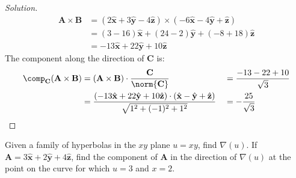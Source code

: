 \documentclass[crop=false,class=book,oneside]{standalone}
\begin{document}
\begin{proof}[Solution]
                \begin{align*}
                    \mathbf{A}\times\mathbf{B}
                    &=
                    (2\hat{\mathbf{x}}
                    +3\hat{\mathbf{y}}
                    -4\hat{\mathbf{z}})
                    \times
                    (-6\hat{\mathbf{x}}
                    -4\hat{\mathbf{y}}
                    +\hat{\mathbf{z}})\\
                    &=
                    (3-16)\hat{\mathbf{x}}
                    +(24-2)\hat{\mathbf{y}}
                    +(-8+18)\hat{\mathbf{z}}\\
                    &=
                    -13\hat{\mathbf{x}}
                    +22\hat{\mathbf{y}}
                    +10\hat{\mathbf{z}}
                \end{align*}
                The component along the direction
                of $\mathbf{C}$ is:
                \begin{align*}
                    \comp_{\mathbf{C}}(\mathbf{A}\times\mathbf{B})
                    &=
                    (\mathbf{A}\times\mathbf{B})
                    \cdot
                    \frac{\mathbf{C}}{\norm{\mathbf{C}}}
                    &
                    &=\frac{-13-22+10}{\sqrt{3}}\\
                    &=
                    \frac{(-13\hat{\mathbf{x}}
                    +22\hat{\mathbf{y}}
                    +10\hat{\mathbf{z}})
                    \cdot
                    (\hat{\mathbf{x}}
                    -\hat{\mathbf{y}}
                    +\hat{\mathbf{z}})}
                    {\sqrt{1^2+(-1)^2+1^2}}
                    &
                    &=-\frac{25}{\sqrt{3}}
                \end{align*}
            \end{proof}
            \begin{problem}[Wangsness 1-8]
                Given a family of hyperbolas in the $xy$
                plane $u=xy$, find $\nabla(u)$.
                If
                $\mathbf{A}%
                 =3\hat{\mathbf{x}}%
                 +2\hat{\mathbf{y}}%
                 +4\hat{\mathbf{z}}$,
                find the component of $\mathbf{A}$
                in the direction of $\nabla(u)$ at
                the point on the curve for which $u=3$ and $x=2$.
            \end{problem}
\end{document}

